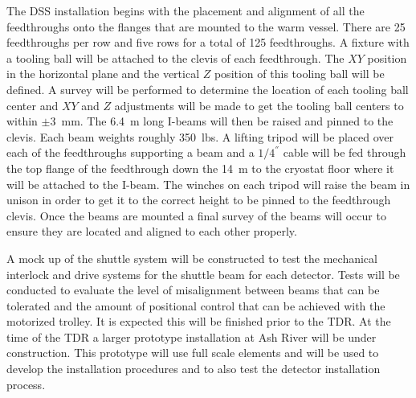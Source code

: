 The DSS installation begins with the placement and alignment of all
the feedthroughs onto the flanges that are mounted to the warm vessel.
There are \num{25} feedthroughs per row and five rows for a total of \num{125}
feedthroughs.  A fixture with a tooling ball will be attached to the
clevis of each feedthrough.  The $XY$ position in the horizontal plane
and the vertical $Z$ position of this tooling ball will be defined.  A
survey will be performed to determine the location of each tooling
ball center and $XY$ and $Z$ adjustments will be made to get the tooling
ball centers to within $\pm$\SI{3}{mm}.  The \SI{6.4}{m} long I-beams will then be
raised and pinned to the clevis.  Each beam weights roughly 350~lbs.
A lifting tripod will be placed over each of the feedthroughs
supporting a beam and a $1/4 ^{''}$ cable will be fed through the top
flange of the feedthrough down the \SI{14}{m} to the cryostat floor where it
will be attached to the I-beam.  The winches on each tripod will raise
the beam in unison in order to get it to the correct height to be
pinned to the feedthrough clevis.  Once the beams are mounted a final
survey of the beams will occur to ensure they are located and aligned
to each other properly.

A mock up of the shuttle system will be constructed to test the
mechanical interlock and drive systems for the shuttle beam
for each detector.  Tests will be conducted to evaluate the level of
misalignment between beams that can be tolerated and the amount of
positional control that can be achieved with the motorized trolley. It
is expected this will be finished prior to the TDR. At the time of the
TDR a larger prototype installation at Ash River will be under
construction. This prototype will use full scale elements and will be
used to develop the installation procedures and to also test the
detector installation process.

